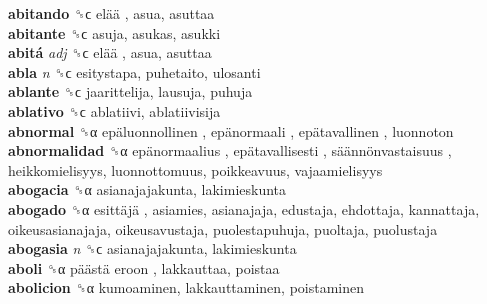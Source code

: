 \textbf{abitando} ␝ϲ   elää , asua, asuttaa  \\
\textbf{abitante} ␝ϲ  asuja, asukas, asukki  \\
\textbf{abitá} \emph{adj}  ␝ϲ   elää , asua, asuttaa  \\
\textbf{abla} \emph{n}  ␝ϲ  esitystapa, puhetaito, ulosanti  \\
\textbf{ablante} ␝ϲ  jaarittelija, lausuja, puhuja  \\
\textbf{ablativo} ␝ϲ  ablatiivi, ablatiivisija  \\
\textbf{abnormal} ␝α   epäluonnollinen ,  epänormaali ,  epätavallinen , luonnoton  \\
\textbf{abnormalidad} ␝α   epänormaalius ,  epätavallisesti ,  säännönvastaisuus , heikkomielisyys, luonnottomuus, poikkeavuus, vajaamielisyys  \\
\textbf{abogacia} ␝α  asianajajakunta, lakimieskunta  \\
\textbf{abogado} ␝α   esittäjä , asiamies, asianajaja, edustaja, ehdottaja, kannattaja, oikeusasianajaja, oikeusavustaja, puolestapuhuja, puoltaja, puolustaja  \\
\textbf{abogasia} \emph{n}  ␝ϲ  asianajajakunta, lakimieskunta  \\
\textbf{aboli} ␝α   päästä eroon , lakkauttaa, poistaa  \\
\textbf{abolicion} ␝α  kumoaminen, lakkauttaminen, poistaminen  \\
